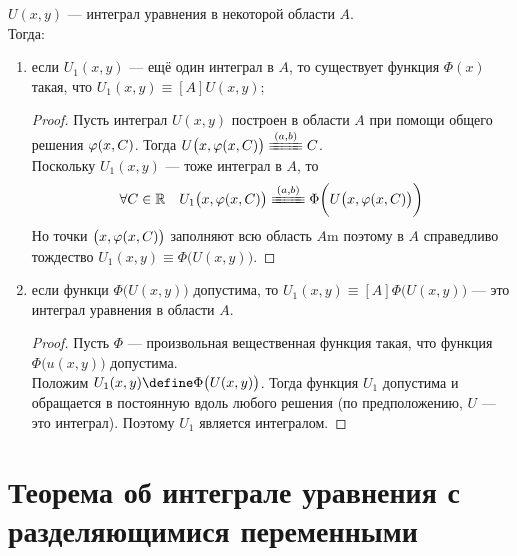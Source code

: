\begin{theorem}
    $ U(x, y) $ --- интеграл уравнения  в некоторой области $ A $. \\
    Тогда:
    \begin{enumerate}
    	\item если $ U_1(x, y) $ --- ещё один интеграл в $ A $, то существует функция $ \Phi(x) $ такая, что $ U_1(x, y) \equiv[A] U(x, y) $;
        \begin{proof}
        	Пусть интеграл $ U(x, y) $ построен в области $ A $ при помощи общего решения $ \varphi(x, C) $. Тогда $ U \big( x, \vphi(x, C) \big) \equiv[(a, b)] C $. \\
            Поскольку $ U_1(x, y) $ --- тоже интеграл в $ A $, то
            $$ \forall C \in \R \quad U_1 \big( x, \vphi(x, C) \big) \equiv[(a, b)] \Phi \bigg( U \big( x, \vphi(x, C) \big) \bigg) $$
            Но точки $ \big(x, \varphi(x, C) \big) $ заполняют всю область $ A $m поэтому в $ A $ справедливо тождество $ U_1(x, y) \equiv \Phi \big( U(x, y) \big) $.
        \end{proof}
        \item если функци $ \Phi \big( U(x, y) \big) $ допустима, то $ U_1(x, y) \equiv[A] \Phi \big( U(x, y) \big) $ --- это интеграл уравнения  в области $ A $.
        \begin{proof}
        	Пусть $ \Phi $ --- произвольная вещественная функция такая, что функция \\
            $ \Phi \big( u(x, y) \big) $ допустима. \\
            Положим $ U_1(x, y) \define \Phi \big( U(x, y) \big) $. Тогда функция $ U_1 $ допустима и обращается в постоянную вдоль любого решения (\as по предположению, $ U $ --- это интеграл). Поэтому $ U_1 $ является интегралом.
        \end{proof}
    \end{enumerate}
\end{theorem}


\section{Теорема об интеграле уравнения с разделяющимися переменными}



